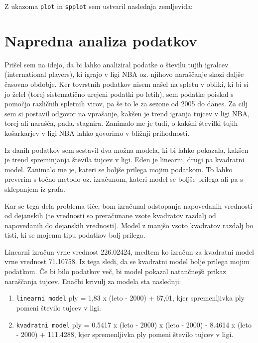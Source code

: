 \documentclass[11pt,a4paper]{article}
\begin{document}
Z ukazoma \verb|plot| in \verb|spplot| sem ustvaril naslednja zemljevida:





\section{Napredna analiza podatkov}

Prišel sem na idejo, da bi lahko analiziral podatke o številu tujih igralcev (international players), ki igrajo v ligi NBA oz. njihovo naraščanje skozi daljše časovno obdobje. Ker tovrstnih podatkov nisem našel na spletu v obliki, ki bi si jo želel (torej sistematično urejeni podatki po letih), sem podatke poiskal s pomočjo različnih spletnih virov, pa še to le za sezone od 2005 do danes. Za cilj sem si postavil odgovor na vprašanje, kakšen je trend igranja tujcev v ligi NBA, torej ali narašča, pada, stagnira. Zanimalo me je tudi, o kakšni številki tujih košarkarjev v ligi NBA lahko govorimo v bližnji prihodnosti.
\smallskip

Iz danih podatkov sem sestavil dva možna modela, ki bi lahko pokazala, kakšen je trend spreminjanja števila tujcev v ligi. Eden je linearni, drugi pa kvadratni model. Zanimalo me je, kateri se boljše prilega mojim podatkom. 
To lahko preverim s točno metodo oz. izračunom, kateri model se boljše prilega ali pa s sklepanjem iz grafa.

\smallskip

Kar se tega dela problema tiče, bom izračunal odstopanja napovedanih vrednosti od dejanskih (te vrednosti so preračunane vsote kvadratov razdalj od napovedanih do dejanskih vrednosti). Model z manjšo vsoto kvadratov razdalj bo tisti, ki se mojemu tipu podatkov bolj prilega.

\smallskip

Linearni izračun vrne vrednost 226.02424, medtem ko izračun za kvadratni model vrne vrednost 71.10758. Iz tega sledi, da se kvadratni model bolje prilega mojim podatkom. Če bi bilo podatkov več, bi model pokazal natančnejši prikaz naraščanja tujcev. 
Enačbi krivulj za modela sta naslednji:
\begin{enumerate}
\item{\verb|linearni model| ply = 1,83 x (leto - 2000) + 67,01, kjer spremenljivka ply pomeni število tujcev v ligi.}
\item{\verb|kvadratni model| ply = 0.5417 x (leto - 2000) x (leto - 2000) - 8.4614 x (leto - 2000) + 111.4288, kjer spremenljivka ply pomeni število tujcev v ligi.}
\end{enumerate}
\end{document}

